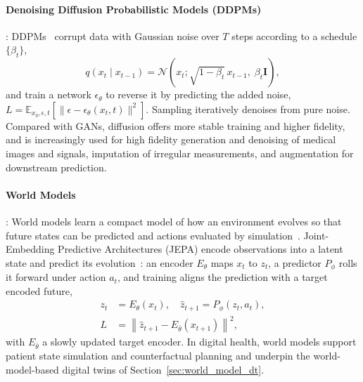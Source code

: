 \documentclass[journal]{IEEEtran}
\begin{document}
\paragraph{Denoising Diffusion Probabilistic Models (DDPMs)}: DDPMs~\cite{ho2020ddpm} corrupt data with Gaussian noise over $T$ steps according to a schedule $\{\beta_t\}$,
\begin{equation}
q(x_t \mid x_{t-1}) = \mathcal{N}\!\left(x_t; \sqrt{1-\beta_t}\, x_{t-1}, \; \beta_t \mathbf{I}\right),
\end{equation}
and train a network $\epsilon_\theta$ to reverse it by predicting the added noise, $L = \mathbb{E}_{x_0,\epsilon,t}[\|\epsilon - \epsilon_\theta(x_t,t)\|^2]$. Sampling iteratively denoises from pure noise. Compared with GANs, diffusion offers more stable training and higher fidelity, and is increasingly used for high fidelity generation and denoising of medical images and signals, imputation of irregular measurements, and augmentation for downstream prediction.

\paragraph{World Models}: World models learn a compact model of how an environment evolves so that future states can be predicted and actions evaluated by simulation~\cite{ha2018worldmodels}. Joint-Embedding Predictive Architectures (JEPA) encode observations into a latent state and predict its evolution~\cite{lecun2022jepa,maes2026leworldmodel}: an encoder $E_\theta$ maps $x_t$ to $z_t$, a predictor $P_\phi$ rolls it forward under action $a_t$, and training aligns the prediction with a target encoded future,
\begin{equation}
\begin{aligned}
z_t &= E_\theta(x_t), \quad \hat{z}_{t+1} = P_\phi(z_t, a_t),\\
L &= \left\| \hat{z}_{t+1} - E_{\bar{\theta}}(x_{t+1}) \right\|^2,
\end{aligned}
\end{equation}
with $E_{\bar{\theta}}$ a slowly updated target encoder. In digital health, world models support patient state simulation and counterfactual planning and underpin the world-model-based digital twins of Section~\ref{sec:world_model_dt}.



\end{document}
